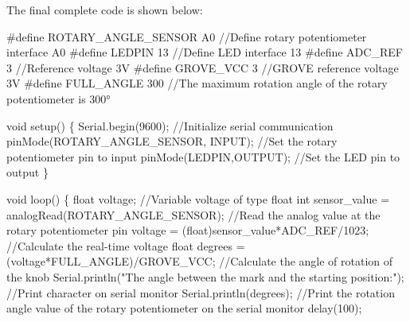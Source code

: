 \documentclass[
  letterpaper,
  DIV=11,
  numbers=noendperiod]{scrreprt}
\newenvironment{Shaded}{\begin{snugshade}}{\end{snugshade}}
\newcommand{\CommentTok}[1]{\textcolor[rgb]{0.37,0.37,0.37}{#1}}
\newcommand{\DataTypeTok}[1]{\textcolor[rgb]{0.68,0.00,0.00}{#1}}
\newcommand{\DecValTok}[1]{\textcolor[rgb]{0.68,0.00,0.00}{#1}}
\newcommand{\NormalTok}[1]{\textcolor[rgb]{0.00,0.23,0.31}{#1}}
\newcommand{\OperatorTok}[1]{\textcolor[rgb]{0.37,0.37,0.37}{#1}}
\newcommand{\PreprocessorTok}[1]{\textcolor[rgb]{0.68,0.00,0.00}{#1}}
\newcommand{\StringTok}[1]{\textcolor[rgb]{0.13,0.47,0.30}{#1}}
\begin{document}
The final complete code is shown below:

\begin{Shaded}
\begin{Highlighting}[]
\PreprocessorTok{\#define ROTARY\_ANGLE\_SENSOR }\NormalTok{A0}\PreprocessorTok{ }\CommentTok{//Define rotary potentiometer interface A0}
\PreprocessorTok{\#define LEDPIN }\DecValTok{13}\PreprocessorTok{ }\CommentTok{//Define LED interface 13}
\PreprocessorTok{\#define ADC\_REF }\DecValTok{3}\PreprocessorTok{ }\CommentTok{//Reference voltage 3V}
\PreprocessorTok{\#define GROVE\_VCC }\DecValTok{3}\PreprocessorTok{ }\CommentTok{//GROVE reference voltage 3V}
\PreprocessorTok{\#define FULL\_ANGLE }\DecValTok{300}\PreprocessorTok{ }\CommentTok{//The maximum rotation angle of the rotary potentiometer is 300°}
 
\DataTypeTok{void}\NormalTok{ setup}\OperatorTok{()}
\OperatorTok{\{}
\NormalTok{    Serial}\OperatorTok{.}\NormalTok{begin}\OperatorTok{(}\DecValTok{9600}\OperatorTok{);} \CommentTok{//Initialize serial communication}
\NormalTok{    pinMode}\OperatorTok{(}\NormalTok{ROTARY\_ANGLE\_SENSOR}\OperatorTok{,}\NormalTok{ INPUT}\OperatorTok{);} \CommentTok{//Set the rotary potentiometer pin to input}
\NormalTok{    pinMode}\OperatorTok{(}\NormalTok{LEDPIN}\OperatorTok{,}\NormalTok{OUTPUT}\OperatorTok{);} \CommentTok{//Set the LED pin to output }
\OperatorTok{\}}
 
\DataTypeTok{void}\NormalTok{ loop}\OperatorTok{()}
\OperatorTok{\{}   
    \DataTypeTok{float}\NormalTok{ voltage}\OperatorTok{;} \CommentTok{//Variable voltage of type float}
    \DataTypeTok{int}\NormalTok{ sensor\_value }\OperatorTok{=}\NormalTok{ analogRead}\OperatorTok{(}\NormalTok{ROTARY\_ANGLE\_SENSOR}\OperatorTok{);} \CommentTok{//Read the analog value at the rotary potentiometer pin}
\NormalTok{    voltage }\OperatorTok{=} \OperatorTok{(}\DataTypeTok{float}\OperatorTok{)}\NormalTok{sensor\_value}\OperatorTok{*}\NormalTok{ADC\_REF}\OperatorTok{/}\DecValTok{1023}\OperatorTok{;} \CommentTok{//Calculate the real{-}time voltage}
    \DataTypeTok{float}\NormalTok{ degrees }\OperatorTok{=} \OperatorTok{(}\NormalTok{voltage}\OperatorTok{*}\NormalTok{FULL\_ANGLE}\OperatorTok{)/}\NormalTok{GROVE\_VCC}\OperatorTok{;} \CommentTok{//Calculate the angle of rotation of the knob}
\NormalTok{    Serial}\OperatorTok{.}\NormalTok{println}\OperatorTok{(}\StringTok{"The angle between the mark and the starting position:"}\OperatorTok{);} \CommentTok{//Print character on serial monitor}
\NormalTok{    Serial}\OperatorTok{.}\NormalTok{println}\OperatorTok{(}\NormalTok{degrees}\OperatorTok{);} \CommentTok{//Print the rotation angle value of the rotary potentiometer on the serial monitor}
\NormalTok{    delay}\OperatorTok{(}\DecValTok{100}\OperatorTok{);}
    

\end{Highlighting}
\end{Shaded}
\end{document}

